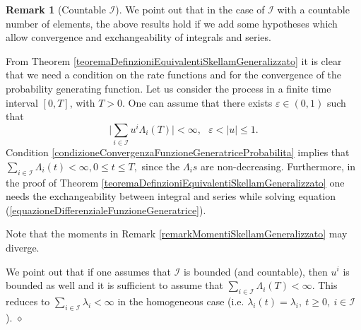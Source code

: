 \documentclass[12pt, twoside, english, headsepline]{article}
\theoremstyle{definition} %
\newtheorem{remark}{Remark}[section] %
\numberwithin{equation}{section} %
\begin{document}
\begin{remark}[Countable $\mathcal{I}$]\label{remarkSkellamInsiemeAmpiezzaSaltiNumerabile}
We point out that in the case of $\mathcal{I}$ with a countable number of elements, the above results hold if we add some hypotheses which allow convergence and exchangeability of integrals and series.

From Theorem \ref{teoremaDefinzioniEquivalentiSkellamGeneralizzato} it is clear that we need a condition on the rate functions and for the convergence of the probability generating function. %
Let us consider the process in a finite time interval $[0,T]$, with $T>0$. One can assume that %
there exists $\varepsilon\in (0,1)$ such that
\begin{equation}\label{condizioneConvergenzaFunzioneGeneratriceProbabilita}
\bigg| \sum_{i\in\mathcal{I}} u^i\Lambda_i(T)\bigg| <\infty,\ \ \ \varepsilon<|u|\le 1.
\end{equation}
Condition \eqref{condizioneConvergenzaFunzioneGeneratriceProbabilita} implies that $\sum_{i\in\mathcal{I}} \Lambda_i(t)<\infty, 0\le t \le T,$ since the $\Lambda_is$ are  non-decreasing.
Furthermore, in the proof of Theorem \ref{teoremaDefinzioniEquivalentiSkellamGeneralizzato} one needs the exchangeability between integral and series while solving equation (\ref{equazioneDifferenzialeFunzioneGeneratrice}). 

Note that the moments in Remark \ref{remarkMomentiSkellamGeneralizzato} may diverge.

We point out that if one assumes that $\mathcal{I}$ is bounded (and countable), then  $u^i$ is bounded as well and it is sufficient to assume that $\sum_{i\in\mathcal{I}} \Lambda_i(T) <\infty$. This reduces to $\sum_{i\in\mathcal{I}} \lambda_i<\infty $ in the homogeneous case (i.e. $\lambda_i(t) = \lambda_i,\ t\ge0,\ i\in\mathcal{I}$).
\hfill$\diamond$
\end{remark}
\end{document}
